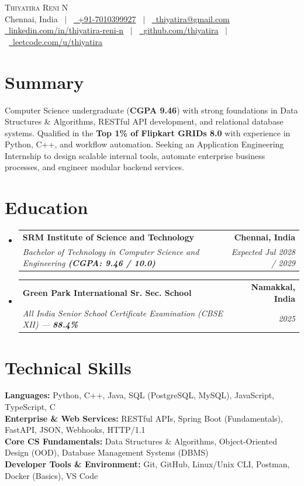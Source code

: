 \documentclass[letterpaper,10pt]{article}
\makeatletter
\newcommand{\resumeSubheading}[4]{
  \vspace{-1pt}\item
    \begin{tabular*}{1.0\textwidth}[t]{l@{\extracolsep{\fill}}r}
      \textbf{#1} & \textbf{\small #2} \\
      \textit{\small#3} & \textit{\small #4} \\
    \end{tabular*}\vspace{-4pt}
}
\newcommand{\resumeSubHeadingListStart}{\begin{itemize}[leftmargin=0.0in, label={}]}
\newcommand{\resumeSubHeadingListEnd}{\end{itemize}}
\makeatother
\begin{document}
\begin{center}
    {\Huge \scshape Thiyatira Reni N} \\ \vspace{3pt}
    \small Chennai, India \ $|$ \ 
    \href{tel:+917010399927}{\faPhone\ +91-7010399927} \ $|$ \ 
    \href{mailto:thiyatira@gmail.com}{\faEnvelope\ thiyatira@gmail.com} \\ \vspace{3pt}
    \href{https://www.linkedin.com/in/thiyatira-reni-n-19668b384/}{\faLinkedin\ \underline{linkedin.com/in/thiyatira-reni-n}} \ $|$ \ 
    \href{https://github.com/thiyatira}{\faGithub\ \underline{github.com/thiyatira}} \ $|$ \ 
    \href{https://leetcode.com/u/thiyatira/}{\faCode\ \underline{leetcode.com/u/thiyatira}}
\end{center}

\section{Summary}
\small{Computer Science undergraduate (\textbf{CGPA 9.46}) with strong foundations in Data Structures \& Algorithms, RESTful API development, and relational database systems. Qualified in the \textbf{Top 1\% of Flipkart GRIDs 8.0} with experience in Python, C++, and workflow automation. Seeking an Application Engineering Internship to design scalable internal tools, automate enterprise business processes, and engineer modular backend services.}

\section{Education}
  \resumeSubHeadingListStart
    \resumeSubheading
      {SRM Institute of Science and Technology}{Chennai, India}
      {Bachelor of Technology in Computer Science and Engineering \textbf{(CGPA: 9.46 / 10.0)}}{Expected Jul 2028 / 2029}
    \resumeSubheading
      {Green Park International Sr. Sec. School}{Namakkal, India}
      {All India Senior School Certificate Examination (CBSE XII) --- \textbf{88.4\%}}{2025}
  \resumeSubHeadingListEnd

\section{Technical Skills}
 \begin{itemize}[leftmargin=0.0in, label={}, itemsep=2pt]
    \small{\item{
     \textbf{Languages:}{ Python, C++, Java, SQL (PostgreSQL, MySQL), JavaScript, TypeScript, C} \\
     \textbf{Enterprise \& Web Services:}{ RESTful APIs, Spring Boot (Fundamentals), FastAPI, JSON, Webhooks, HTTP/1.1} \\
     \textbf{Core CS Fundamentals:}{ Data Structures \& Algorithms, Object-Oriented Design (OOD), Database Management Systems (DBMS)} \\
     \textbf{Developer Tools \& Environment:}{ Git, GitHub, Linux/Unix CLI, Postman, Docker (Basics), VS Code}
    }}
 \end{itemize}
\end{document}
